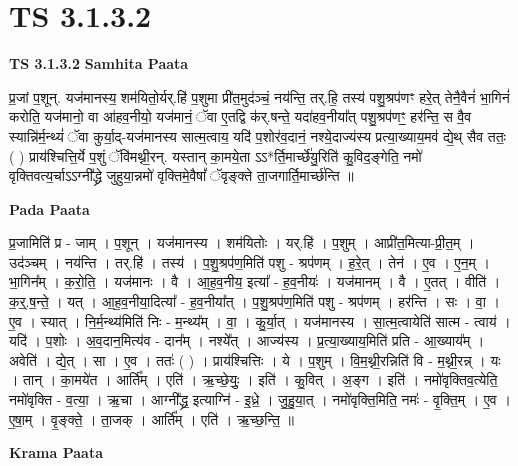 \documentclass[17pt]{extarticle}
\begin{document}
\section{ TS 3.1.3.2 }

\textbf{TS 3.1.3.2 } \newline
\textbf{Samhita Paata} \newline

प्र॒जां प॒शून्. यज॑मानस्य॒ शम॑यितो॒र्यर्.हि॑ प॒शुमा प्री॑त॒मुद॑ञ्चं॒ नय॑न्ति॒ तर्.हि॒ तस्य॑ पशु॒श्रप॑णꣳ हरे॒त् तेनै॒वैनं॑ भा॒गिनं॑ करोति॒ यज॑मानो॒ वा आ॑हव॒नीयो॒ यज॑मानं॒ ॅवा ए॒तद्वि क॑र्.षन्ते॒ यदा॑हव॒नीया᳚त् पशु॒श्रप॑णꣳ॒॒ हर॑न्ति॒ स वै॒व स्यान्नि॑र्म॒न्थ्यं॑ ॅवा कुर्या॒द्-यज॑मानस्य सात्म॒त्वाय॒ यदि॑ प॒शोर॑व॒दानं॒ नश्ये॒दाज्य॑स्य प्रत्या॒ख्याय॒मव॑ द्ये॒थ् सैव ततः॒ ( ) प्राय॑श्चित्ति॒र्ये प॒शुं ॅवि॑मथ्नी॒रन्. यस्तान् का॒मये॒ता ऽऽ*र्ति॒मार्च्छे॑यु॒रिति॑ कु॒विद॒ङ्गेति॒ नमो॑ वृक्तिवत्य॒र्चाऽऽग्नी᳚द्ध्रे जुहुया॒न्नमो॑ वृक्तिमे॒वैषां᳚ ॅवृङ्क्ते ता॒जगार्ति॒मार्च्छ॑न्ति ॥ \newline

\textbf{Pada Paata} \newline

प्र॒जामिति॑ प्र - जाम् । प॒शून् । यज॑मानस्य । शम॑यितोः । यर्.हि॑ । प॒शुम् । आप्री॑त॒मित्या-प्री॒त॒म् । उद॑ञ्चम् । नय॑न्ति । तर्.हि॑ । तस्य॑ । प॒शु॒श्रप॑ण॒मिति॑ पशु - श्रप॑णम् । ह॒रे॒त् । तेन॑ । ए॒व । ए॒न॒म् । भा॒गिन᳚म् । क॒रो॒ति॒ । यज॑मानः । वै । आ॒ह॒व॒नीय॒ इत्या᳚ - ह॒व॒नीयः॑ । यज॑मानम् । वै । ए॒तत् । वीति॑ । क॒र्॒.ष॒न्ते॒ । यत् । आ॒ह॒व॒नीया॒दित्या᳚ - ह॒व॒नीया᳚त् । प॒शु॒श्रप॑ण॒मिति॑ पशु - श्रप॑णम् । हर॑न्ति । सः । वा॒ । ए॒व । स्यात् । नि॒र्म॒न्थ्य॑मिति॑ निः - म॒न्थ्य᳚म् । वा॒ । कु॒र्या॒त् । यज॑मानस्य । सा॒त्म॒त्वायेति॑ सात्म - त्वाय॑ । यदि॑ । प॒शोः । अ॒व॒दान॒मित्य॑व - दान᳚म् । नश्ये᳚त् । आज्य॑स्य । प्र॒त्या॒ख्याय॒मिति॑ प्रति - आ॒ख्याय᳚म् । अवेति॑ । द्ये॒त् । सा । ए॒व । ततः॑ ( ) । प्राय॑श्चित्तिः । ये । प॒शुम् । वि॒म॒थ्नी॒रन्निति॑ वि - म॒थ्नी॒रन्न् । यः । तान् । का॒मये॑त । आर्ति᳚म् । एति॑ । ऋ॒च्छे॒युः॒ । इति॑ । कु॒वित् । अ॒ङ्ग । इति॑ । नमो॑वृक्तिव॒त्येति॒ नमो॑वृक्ति - व॒त्या॒ । ऋ॒चा । आग्नी᳚द्ध्र॒ इत्याग्नि॑ - इ॒ध्रे॒ । जु॒हु॒या॒त् । नमो॑वृक्ति॒मिति॒ नमः॑ - वृ॒क्ति॒म् । ए॒व । ए॒षा॒म् । वृ॒ङ्क्ते॒ । ता॒जक् । आर्ति᳚म् । एति॑ । ऋ॒च्छ॒न्ति॒ ॥  \newline


\textbf{Krama Paata} \newline
\end{document}
